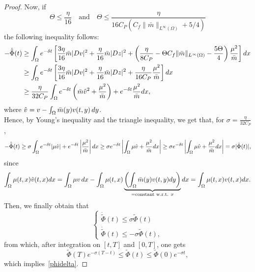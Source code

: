 \documentclass[10pt,a4paper]{amsart}
\newcommand{\di}{{\rm d}}
\begin{document}
\begin{proof}
		Now, if $$\Theta \le \frac\eta{16} \quad \text{and} \quad \Theta \le \frac{\eta}{16C_P(C_f \|\bar{m}\|_{L^{\infty}(\Omega)} + 5/4)}$$ the following inequality follows:
		\begin{equation}\label{part3}
			\begin{split}
				-\dot{\tilde{\Phi}}(t) & \geq \int_{\Omega} e^{-\delta t}  \left[ \frac{3\eta}{16} \bar{m} |Dv|^2+  \frac\eta{16}  \bar{m} |Dz|^2 +\left(\frac{\eta}{8C_P}- \Theta C_f \|\bar{m}\|_{L^{\infty}(\Omega)} -\frac{5\Theta}{4} \right) \frac{\mu^2}{\bar{m}} \right] \di x \\
				& \geq \int_{\Omega} e^{-\delta t}  \left[ \frac{3\eta}{16} \bar{m} |Dv|^2+  \frac\eta{16}  \bar{m} |Dz|^2+ \frac{\eta}{16C_P} \frac{\mu^2}{\bar{m}} \right] \di x \\
				& \geq \frac{\eta}{32 C_P} \int_{\Omega} e^{-\delta t} \left( \bar{m}\hat{v}^2 + \frac{\mu^2}{\bar{m}} \right) + e^{-\delta t} \frac{\mu^2}{\bar{m}} \di x,
			\end{split}
		\end{equation}
		where $\hat{v}=v-\int_{\Omega} \bar{m}(y) v(t,y) \, \di y$. \\
		Hence, by Young's inequality and the triangle inequality, we get that, for $\sigma = \frac{\eta}{32 C_P}$,
		\begin{equation*}
			-\dot{\tilde{\Phi}}(t) \geq \sigma \int_{\Omega} e^{-\delta t} |\mu \hat{v}| + e^{-\delta t} \left| \frac{\mu^2}{\bar{m}} \right| \di x \geq \sigma e^{-\delta t} \left| \int_{\Omega} \mu \hat{v} + \frac{\mu^2}{\bar{m}} \di x \right| \geq \sigma e^{-\delta t} \left| \int_{\Omega} \mu \hat{v} + \frac{\mu^2}{\bar{m}} \di x \right| = \sigma |\tilde{\Phi}(t)|,
		\end{equation*}
		since
		\begin{equation*}
			\int_{\Omega} \mu(t,x)\hat{v}(t,x) \di x = \int_{\Omega} \mu v \, \di x - \int_{\Omega} \mu(t,x) \underbrace{\left( \int_{\Omega} \bar{m}(y)v(t,y) \di y \right)}_{=\text{constant w.r.t. } x} \di x = \int_{\Omega} \mu(t,x) v(t,x) \di x.
		\end{equation*}
		Then, we finally obtain that
		\begin{equation*}
			\begin{cases}
				\dot{\tilde{\Phi}}(t) \le \sigma \tilde{\Phi}(t) \\
				\dot{\tilde{\Phi}}(t) \le -\sigma \tilde{\Phi}(t),
			\end{cases}
		\end{equation*}
		from which, after integration on $[t,T]$ and $[0,T]$, one gets
		\begin{equation}\label{tildephiineq}
			\tilde{\Phi}(T) e^{-\sigma(T-t)} \le \tilde{\Phi}(t) \le \tilde{\Phi}(0) e^{-\sigma t},
		\end{equation}
		which implies~\eqref{phidelta}.
		

\end{proof}
\end{document}
